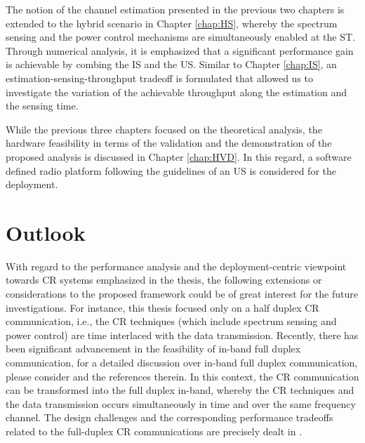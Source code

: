 The notion of the channel estimation presented in the previous two chapters is extended to the hybrid scenario in Chapter \ref{chap:HS}, whereby the spectrum sensing and the power control mechanisms are simultaneously enabled at the ST. Through numerical analysis, it is emphasized that a significant performance gain is achievable by combing the IS and the US. Similar to Chapter \ref{chap:IS}, an estimation-sensing-throughput tradeoff is formulated that allowed us to investigate the variation of the achievable throughput along the estimation and the sensing time. 

While the previous three chapters focused on the theoretical analysis, the hardware feasibility in terms of the validation and the demonstration of the proposed analysis is discussed in Chapter \ref{chap:HVD}. In this regard, a software defined radio platform following the guidelines of an US is considered for the deployment. 


\section{Outlook}
With regard to the performance analysis and the deployment-centric viewpoint towards CR systems emphasized in the thesis, the following extensions or considerations to the proposed framework could be of great interest for the future investigations. For instance, this thesis focused only on a half duplex CR communication, i.e., the CR techniques (which include spectrum sensing and power control) are time interlaced with the data transmission. Recently, there has been significant advancement in the feasibility of in-band full duplex communication, for a detailed discussion over in-band full duplex communication, please consider \cite{Bhar13, Sab14, Liu15} and the references therein. In this context, the CR communication can be transformed into the full duplex in-band, whereby the CR techniques and the data transmission occurs simultaneously in time and over the same frequency channel. The design challenges and the corresponding performance tradeoffs related to the full-duplex CR communications are precisely dealt in \cite{Liao15, Kim15}. 

